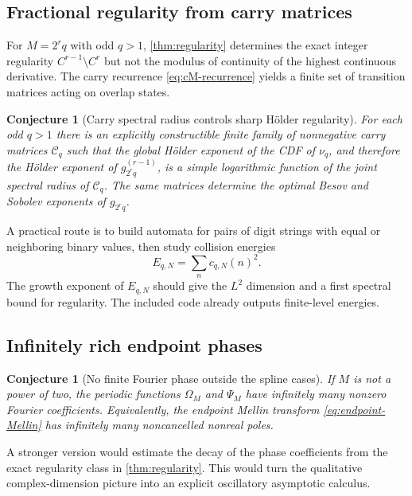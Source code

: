 \documentclass[11pt,oneside]{article}
\newtheorem{conjecture}[theorem]{Conjecture}
\theoremstyle{definition}
\theoremstyle{remark}
\numberwithin{equation}{section}
\newcommand{\1}{\mathbf 1}
\begin{document}
\subsection{Fractional regularity from carry matrices}

For $M=2^rq$ with odd $q>1$, \cref{thm:regularity} determines the exact integer
regularity $C^{r-1}\setminus C^r$ but not the modulus of continuity of the highest
continuous derivative.  The carry recurrence \eqref{eq:cM-recurrence} yields a finite set
of transition matrices acting on overlap states.

\begin{conjecture}[Carry spectral radius controls sharp H\"older regularity]
\label{conj:carry-regularity}
For each odd $q>1$ there is an explicitly constructible finite family of nonnegative carry
matrices $\mathscr C_q$ such that the global H\"older exponent of the CDF of $\nu_q$, and
therefore the H\"older exponent of $g_{2^rq}^{(r-1)}$, is a simple logarithmic function of the
joint spectral radius of $\mathscr C_q$.  The same matrices determine the optimal Besov and
Sobolev exponents of $g_{2^rq}$.
\end{conjecture}

A practical route is to build automata for pairs of digit strings with equal or neighboring
binary values, then study collision energies
\[
 E_{q,N}=\sum_n c_{q,N}(n)^2.
\]
The growth exponent of $E_{q,N}$ should give the $L^2$ dimension and a first spectral
bound for regularity.  The included code already outputs finite-level energies.

\subsection{Infinitely rich endpoint phases}

\begin{conjecture}[No finite Fourier phase outside the spline cases]
\label{conj:phase-modes}
If $M$ is not a power of two, the periodic functions $\Omega_M$ and $\Psi_M$ have
infinitely many nonzero Fourier coefficients.  Equivalently, the endpoint Mellin transform
\eqref{eq:endpoint-Mellin} has infinitely many noncancelled nonreal poles.
\end{conjecture}

A stronger version would estimate the decay of the phase coefficients from the exact
regularity class in \cref{thm:regularity}.  This would turn the qualitative complex-dimension
picture into an explicit oscillatory asymptotic calculus.
\end{document}
